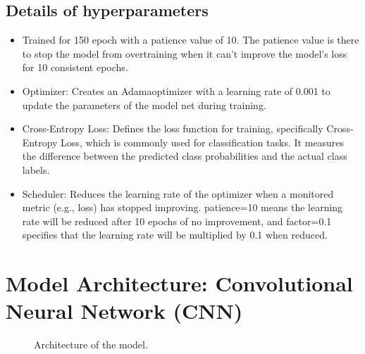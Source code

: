 \documentclass[a4paper,oneside,11pt]{book}
\begin{document}
\subsection{Details of hyperparameters}
\begin{itemize}
    \item Trained for 150 epoch with a patience value of 10.
    The patience value is there to stop the model from overtraining when it can’t improve the model’s loss for 10 consistent epochs.
    \item Optimizer:  Creates an Adamaoptimizer with a learning rate of 0.001 to update the parameters of the model net during training.
    \item Cross-Entropy Loss: Defines the loss function for training, specifically Cross-Entropy Loss, which is commonly used for classification tasks. It measures the difference between the predicted class probabilities and the actual class labels.
    \item Scheduler:  Reduces the learning rate of the optimizer when a monitored metric (e.g., loss) has stopped improving. patience=10 means the learning rate will be reduced after 10 epochs of no improvement, and factor=0.1 specifies that the learning rate will be multiplied by 0.1 when reduced.
\end{itemize}
\section{Model Architecture: Convolutional Neural Network (CNN)}
\begin{figure}[H]
    \centering
    \caption{Architecture of the model.}
\end{figure}
\end{document}
